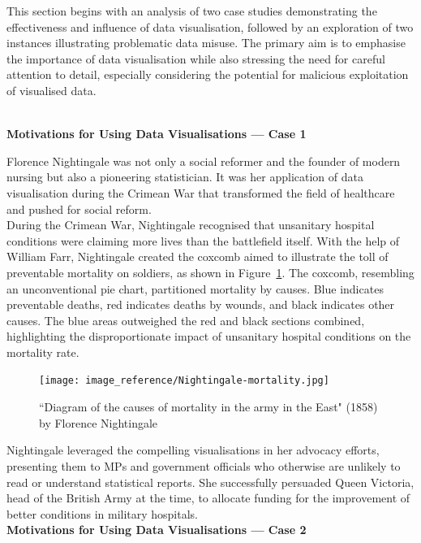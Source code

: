 \documentclass{article}\usepackage[]{graphicx}\usepackage[]{xcolor}
\numberwithin{equation}{section}
\begin{document}
\noindent This section begins with an analysis of two case studies demonstrating the effectiveness and influence of data visualisation, followed by an exploration of two instances illustrating problematic data misuse. The primary aim is to emphasise the importance of data visualisation while also stressing the need for careful attention to detail, especially considering the potential for malicious exploitation of visualised data.

\noindent
\\\textbf{Motivations for Using Data Visualisations — Case 1}

\noindent
Florence Nightingale was not only a social reformer and the founder of modern nursing but also a pioneering statistician. It was her application of data visualisation during the Crimean War that transformed the field of healthcare and pushed for social reform.\\  

\noindent
During the Crimean War, Nightingale recognised that unsanitary hospital conditions were claiming more lives than the battlefield itself. With the help of William Farr, Nightingale created the coxcomb aimed to illustrate the toll of preventable mortality on soldiers, as shown in Figure~\ref{fig:coxcomb}. The coxcomb, resembling an unconventional pie chart, partitioned mortality by causes. Blue indicates preventable deaths, red indicates deaths by wounds, and black indicates other causes. The blue areas outweighed the red and black sections combined, highlighting the disproportionate impact of unsanitary hospital conditions on the mortality rate.

\begin{figure}[H]
    \centering
    \texttt{[image: image\_reference/Nightingale-mortality.jpg]}
    \caption{``Diagram of the causes of mortality in the army in the East" (1858) by Florence Nightingale \cite{graphFN}}
    \label{fig:coxcomb}
\end{figure}

\noindent
Nightingale leveraged the compelling visualisations in her advocacy efforts, presenting them to MPs and government officials who otherwise are unlikely to read or understand statistical reports. She successfully persuaded Queen Victoria, head of the British Army at the time, to allocate funding for the improvement of better conditions in military hospitals.\\

\noindent
\textbf{Motivations for Using Data Visualisations — Case 2}
\end{document}
